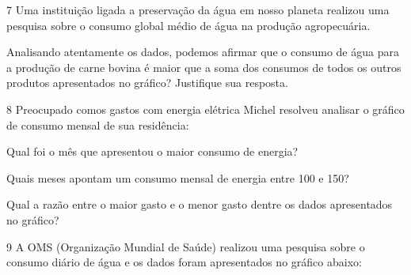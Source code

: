 {\num{7} Uma instituição ligada a preservação da água em nosso planeta
realizou uma pesquisa sobre o consumo global médio de água na produção
agropecuária.


Analisando atentamente os dados, podemos afirmar que o consumo de água
para a produção de carne bovina é maior que a soma dos consumos de todos
os outros produtos apresentados no gráfico? Justifique sua resposta.



\num{8} Preocupado comos gastos com energia elétrica Michel resolveu
analisar o gráfico de consumo mensal de sua residência:


\begin{escolha}
\item
  Qual foi o mês que apresentou o maior consumo de energia?


\item
  Quais meses apontam um consumo mensal de energia entre 100 e 150?


\item
  Qual a razão entre o maior gasto e o menor gasto dentre os dados
  apresentados no gráfico?

\end{escolha}


\num{9} A OMS (Organização Mundial de Saúde) realizou uma pesquisa sobre o
consumo diário de água e os dados foram apresentados no gráfico abaixo:


}
